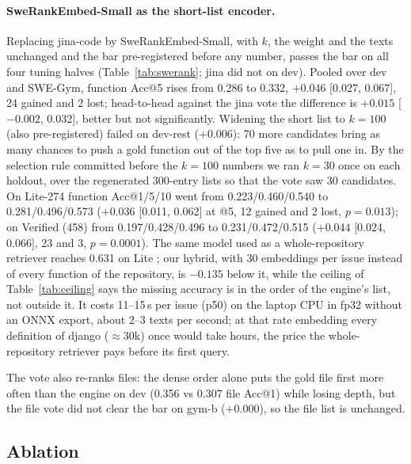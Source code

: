 \documentclass[10pt,twocolumn]{article}
\makeatletter
\newcommand{\accat}[1]{Acc@#1}
\makeatother
\begin{document}
\paragraph{SweRankEmbed-Small as the short-list encoder.}
Replacing jina-code by SweRankEmbed-Small, with $k$, the weight and the texts unchanged and the bar
pre-registered before any number, passes the bar on all four tuning halves (Table~\ref{tab:swerank};
jina did not on dev). Pooled over dev and SWE-Gym, function \accat{5} rises from 0.286 to 0.332,
$+0.046$ [0.027, 0.067], 24 gained and 2 lost; head-to-head against the jina vote the difference is
$+0.015$ [$-0.002$, 0.032], better but not significantly. Widening the short list to $k=100$ (also
pre-registered) failed on dev-rest ($+0.006$): 70 more candidates bring as many chances to push a gold
function out of the top five as to pull one in. By the selection rule committed before the $k=100$
numbers we ran $k=30$ once on each holdout, over the regenerated 300-entry lists so that the vote saw
30 candidates. On Lite-274 function \accat{1}/5/10 went from 0.223/0.460/0.540 to
0.281/0.496/0.573 ($+0.036$ [0.011, 0.062] at @5, 12 gained and 2 lost, $p=0.013$); on Verified (458)
from 0.197/0.428/0.496 to 0.231/0.472/0.515 ($+0.044$ [0.024, 0.066], 23 and 3, $p=0.0001$). The
same model used as a whole-repository retriever reaches 0.631 on Lite \citep{reddy2026swerank}; our
hybrid, with 30 embeddings per issue instead of every function of the repository, is $-0.135$ below
it, while the ceiling of Table~\ref{tab:ceiling} says the missing accuracy is in the order of the
engine's list, not outside it. It costs 11--15\,s per issue (p50) on the laptop CPU in fp32 without an
ONNX export, about 2--3 texts per second; at that rate embedding every definition of django
($\approx$30k) once would take hours, the price the whole-repository retriever pays before its first
query.

The vote also re-ranks files: the dense order alone puts the gold file first more often than the
engine on dev (0.356 vs 0.307 file \accat{1}) while losing depth, but the file vote did not clear the
bar on gym-b ($+0.000$), so the file list is unchanged.

\subsection{Ablation}
\label{sec:ablation}


\end{document}
